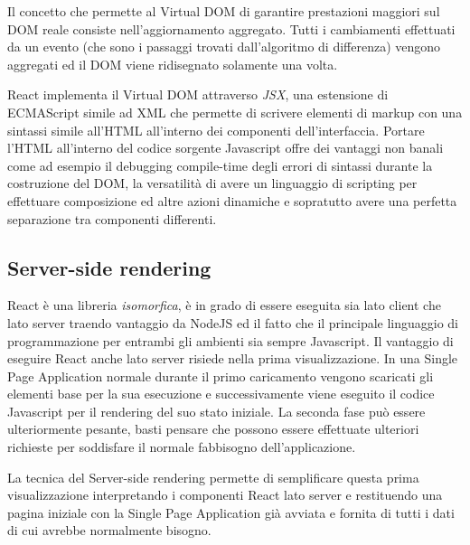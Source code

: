 Il concetto che permette al Virtual DOM di garantire prestazioni maggiori sul DOM reale consiste nell'aggiornamento aggregato. Tutti i cambiamenti effettuati da un evento (che sono i passaggi trovati dall'algoritmo di differenza) vengono aggregati ed il DOM viene ridisegnato solamente una volta.

React implementa il Virtual DOM attraverso \textit{JSX}, una estensione di ECMAScript simile ad XML che permette di scrivere elementi di markup con una sintassi simile all'HTML all'interno dei componenti dell'interfaccia. Portare l'HTML all'interno del codice sorgente Javascript offre dei vantaggi non banali come ad esempio il debugging compile-time degli errori di sintassi durante la costruzione del DOM, la versatilità di avere un linguaggio di scripting per effettuare composizione ed altre azioni dinamiche e sopratutto avere una perfetta separazione tra componenti differenti.


\subsection{Server-side rendering}
React è una libreria \textit{isomorfica}, è in grado di essere eseguita sia lato client che lato server traendo vantaggio da NodeJS ed il fatto che il principale linguaggio di programmazione per entrambi gli ambienti sia sempre Javascript.
Il vantaggio di eseguire React anche lato server risiede nella prima visualizzazione. In una Single Page Application normale durante il primo caricamento vengono scaricati gli elementi base per la sua esecuzione e successivamente viene eseguito il codice Javascript per il rendering del suo stato iniziale. La seconda fase può essere ulteriormente pesante, basti pensare che possono essere effettuate ulteriori richieste per soddisfare il normale fabbisogno dell'applicazione.

La tecnica del Server-side rendering permette di semplificare questa prima visualizzazione interpretando i componenti React lato server e restituendo una pagina iniziale con la Single Page Application già avviata e fornita di tutti i dati di cui avrebbe normalmente bisogno.